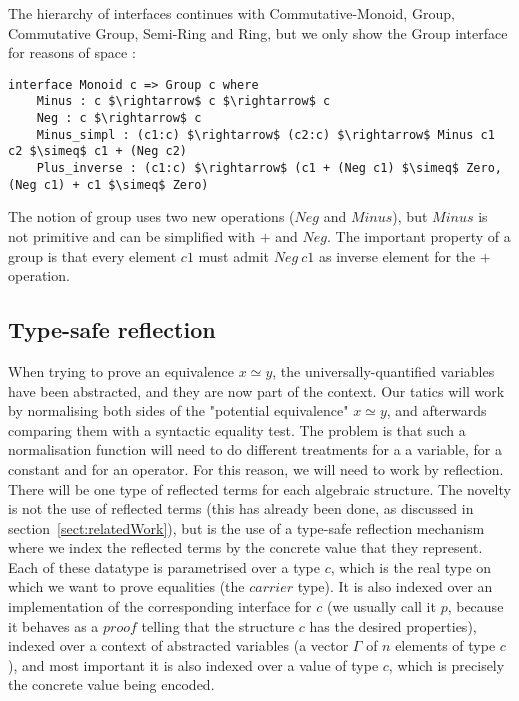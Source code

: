 The hierarchy of interfaces continues with Commutative-Monoid, Group, Commutative Group, Semi-Ring and Ring, but we only show the Group interface for reasons of space :

\begin{lstlisting}
interface Monoid c => Group c where
    Minus : c $\rightarrow$ c $\rightarrow$ c
    Neg : c $\rightarrow$ c
    Minus_simpl : (c1:c) $\rightarrow$ (c2:c) $\rightarrow$ Minus c1 c2 $\simeq$ c1 + (Neg c2) 
    Plus_inverse : (c1:c) $\rightarrow$ (c1 + (Neg c1) $\simeq$ Zero, (Neg c1) + c1 $\simeq$ Zero)
\end{lstlisting}

The notion of group uses two new operations ($Neg$ and $Minus$), but $Minus$ is not primitive and can be simplified with $+$ and $Neg$. The important property of a group is that every element $c1$ must admit $Neg\ c1$ as inverse element for the $+$ operation.

\subsection{Type-safe reflection}
\label{sect:typeSafeReflection}
			
When trying to prove an equivalence $x \simeq y$, the universally-quantified variables have been abstracted, and they are now part of the context. Our tatics will work by normalising both sides of the "potential equivalence" $x \simeq y$, and afterwards comparing them with a syntactic equality test. The problem is that such a normalisation function will need to do different treatments for a a variable, for a constant and for an operator. For this reason, we will need to work by reflection. There will be one type of reflected terms for each algebraic structure. The novelty is not the use of reflected terms (this has already been done, as discussed in section~\ref{sect:relatedWork}), but is the use of a type-safe reflection mechanism where we index the reflected terms by the concrete value that they represent. Each of these datatype is parametrised over a type $c$, which is the real type on which we want to prove equalities (the $carrier$ type). It is also indexed over an implementation of the corresponding interface for $c$ (we usually call it $p$, because it behaves as a $proof$ telling that the structure $c$ has the desired properties), indexed over a context of abstracted variables (a vector $\Gamma$ of $n$ elements of type $c$), and most important it is also indexed over a value of type $c$, which is precisely the concrete value being encoded.

